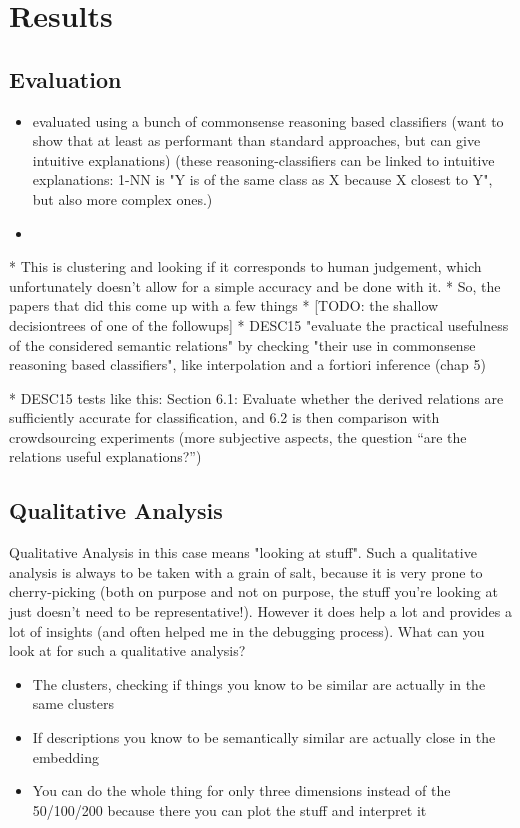 \chapter{Results}


	
		
\section{Evaluation} %

\begin{itemize}
	\item \cite{Derrac2015} evaluated using a bunch of commonsense reasoning based classifiers (want to show that at least as performant than standard approaches, but can give intuitive explanations) (these reasoning-classifiers can be linked to intuitive explanations: 1-NN is "Y is of the same class as X because X closest to Y", but also more complex ones.) 
	\item 
\end{itemize}

* This is clustering and looking if it corresponds to human judgement, which unfortunately doesn't allow for a simple accuracy and be done with it.
* So, the papers that did this come up with a few things
* [TODO: the shallow decisiontrees of one of the followups]
* DESC15 "evaluate the practical usefulness of the considered semantic relations" by checking "their use in commonsense reasoning based classifiers", like interpolation and a fortiori inference (chap 5)


* DESC15 tests like this: Section 6.1: Evaluate whether the derived relations are sufficiently accurate for classification, and 6.2 is then comparison with crowdsourcing experiments (more subjective aspects, the question “are the relations useful explanations?”)



\section{Qualitative Analysis}

Qualitative Analysis in this case means "looking at stuff". Such a qualitative analysis is always to be taken with a grain of salt, because it is very prone to cherry-picking (both on purpose and not on purpose, the stuff you're looking at just doesn't need to be representative!). However it does help a lot and provides a lot of insights (and often helped me in the debugging process).
What can you look at for such a qualitative analysis?
\begin{itemize}
	\item The clusters, checking if things you know to be similar are actually in the same clusters
	\item If descriptions you know to be semantically similar are actually close in the embedding
	\item You can do the whole thing for only three dimensions instead of the 50/100/200 because there you can plot the stuff and interpret it
\end{itemize}

